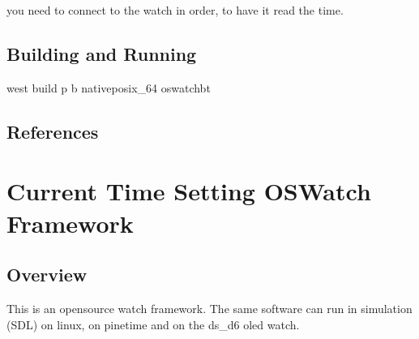 \documentclass[letterpaper,10pt,english]{sphinxmanual}
\begin{document}
\begin{sphinxVerbatim}[commandchars=\\\{\}]
 
\end{sphinxVerbatim}

you need to connect to the watch in order, to have it read the time.

\begin{sphinxVerbatim}[commandchars=\\\{\}]
      
      
\end{sphinxVerbatim}


\subsection{Building and Running}
\label{\detokenize{samples/oswatch-btREADME:building-and-running}}
west build \sphinxhyphen{}p \sphinxhyphen{}b  native\sphinxhyphen{}posix\_64 oswatch\sphinxhyphen{}bt


\subsection{References}
\label{\detokenize{samples/oswatch-btREADME:references}}

\section{Current Time Setting  OSWatch Framework}
\label{\detokenize{samples/oswatch-ctsREADME:current-time-setting-oswatch-framework}}\label{\detokenize{samples/oswatch-ctsREADME:oswatch}}\label{\detokenize{samples/oswatch-ctsREADME::doc}}

\subsection{Overview}
\label{\detokenize{samples/oswatch-ctsREADME:overview}}
This is an opensource watch framework.
The same software can run in simulation (SDL) on linux, on pinetime and on the ds\_d6 oled watch.
\end{document}

